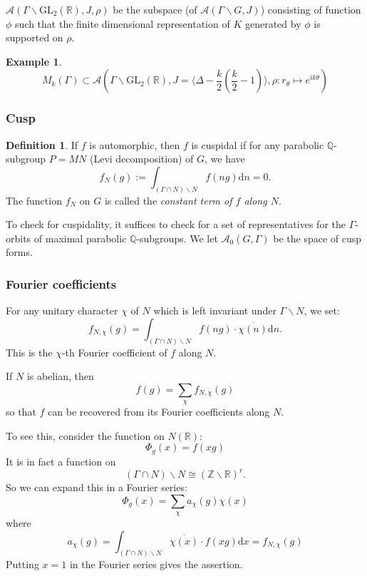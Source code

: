 \documentclass[11pt,english]{smfart}
\theoremstyle{definition}
\newtheorem{definition}{Definition}
\newtheorem{example}{Example}
\theoremstyle{remark}
\begin{document}
$\mathcal{A}(\Gamma \backslash \mathrm{GL_2}(\mathbb{R}),J,\rho)$ be the subspace (of $\mathcal{A}(\Gamma \backslash G,J)$) consisting of function $\phi$ such that the finite dimensional representation of $K$ generated by $\phi $ is supported on $\rho$.
\begin{example}
\[M_k(\Gamma) \subset \mathcal{A}(\Gamma \backslash \mathrm{GL_2}(\mathbb{R}),J=\langle  \Delta -\frac{k}{2}(\frac{k}{2}-1) \rangle,\rho: r_\theta \mapsto e^{ik\theta})\]
\end{example}
\subsubsection{Cusp}
\begin{definition}
    If $ f $ is automorphic, then $ f $ is cuspidal if for any parabolic $\mathbb{Q}$-subgroup $ P=M N $ (Levi decomposition) of $ G $, we have
    \[f_{N}(g):=\int_{(\Gamma \cap N) \backslash N} f(n g) \mathrm{d} n=0 .\]    
    The function $ f_{N} $ on $ G $ is called the \textit{constant term of $ f $ along $ N $}.
\end{definition}
To check for cuspidality, it suffices to check for a set of representatives for the $ \Gamma $-orbits of maximal parabolic $\mathbb{Q}$-subgroups.
We let $ \mathcal{A}_{0}(G, \Gamma) $ be the space of cusp forms.
\subsubsection{Fourier coefficients}
For any unitary character $ \chi $ of $ N $ which is left invariant under $\Gamma \backslash N $, we set:
\[f_{N, \chi}(g)=\int_{(\Gamma \cap N) \backslash N} f(n g) \cdot \overline{\chi(n)} \mathrm{d} n .\]
This is the $ \chi $-th Fourier coefficient of $ f $ along $ N $.

If $ N $ is abelian, then
\[f(g)=\sum_{\chi} f_{N, \chi}(g)\]
so that $ f $ can be recovered from its Fourier coefficients along $ N $.

To see this, consider the function on $ N(\mathbb{R})$:
\[\Phi_{g}(x)=f(x g)\]
It is in fact a function on
\[(\Gamma \cap N )\backslash N \cong(\mathbb{Z} \backslash \mathbb{R})^{r}.\]
So we can expand this in a Fourier series:
\[\Phi_{g}(x)=\sum_{\chi} a_{\chi}(g) \chi(x)\]
where
\[a_{\chi}(g)=\int_{(\Gamma \cap N) \backslash N} \overline{\chi(x)} \cdot f(x g) \mathrm{d} x=f_{N, \chi}(g)\]
Putting $ x=1 $ in the Fourier series gives the assertion.
\end{document}
